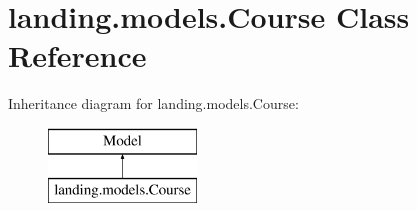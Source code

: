\hypertarget{classlanding_1_1models_1_1Course}{}\section{landing.\+models.\+Course Class Reference}
\label{classlanding_1_1models_1_1Course}
Inheritance diagram for landing.\+models.\+Course\+:\begin{figure}[H]
\begin{center}
\leavevmode
\includegraphics[height=2.000000cm]{classlanding_1_1models_1_1Course}
\end{center}
\end{figure}
